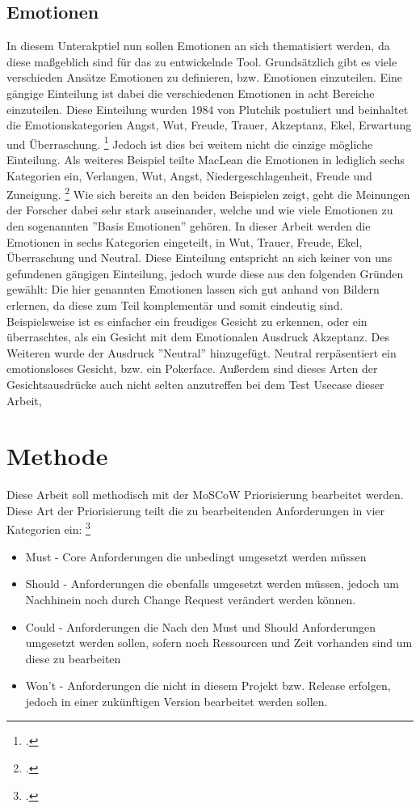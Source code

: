\documentclass[12pt, a4paper]{scrbook}
\begin{document}
\section{Emotionen}
In diesem Unterakptiel nun sollen Emotionen an sich thematisiert werden, da diese maßgeblich sind für das zu entwickelnde Tool. Grundsätzlich gibt es viele verschieden Ansätze Emotionen zu definieren, bzw. Emotionen einzuteilen. Eine gängige Einteilung ist dabei die verschiedenen Emotionen in acht Bereiche einzuteilen. Diese Einteilung wurden 1984 von Plutchik postuliert und beinhaltet die Emotionskategorien Angst, Wut, Freude, Trauer, Akzeptanz, Ekel, Erwartung und Überraschung.
\footcite[Vgl. ][3]{FaceRec}
Jedoch ist dies bei weitem nicht die einzige mögliche Einteilung. Als weiteres Beispiel teilte MacLean  die Emotionen in lediglich sechs Kategorien ein, Verlangen, Wut, Angst, Niedergeschlagenheit, Freude und Zuneigung.
\footcite[Vgl. ][3]{FaceRec}
Wie sich bereits an den beiden Beispielen zeigt, geht die Meinungen der Forscher  dabei sehr stark auseinander, welche und wie viele Emotionen zu den sogenannten ''Basis Emotionen'' gehören. In dieser Arbeit werden die Emotionen in sechs Kategorien eingeteilt, in Wut, Trauer, Freude, Ekel, Überraschung und Neutral. Diese Einteilung entspricht an sich keiner von uns gefundenen gängigen Einteilung, jedoch wurde diese aus den folgenden Gründen gewählt:
Die hier genannten Emotionen lassen sich gut anhand von Bildern erlernen, da diese zum Teil komplementär und somit eindeutig sind. Beispielsweise ist es einfacher ein freudiges Gesicht zu erkennen, oder ein überraschtes, als ein Gesicht mit dem Emotionalen Ausdruck Akzeptanz. Des Weiteren wurde der Ausdruck ''Neutral'' hinzugefügt. Neutral rerpäsentiert ein emotionsloses Gesicht, bzw. ein Pokerface. Außerdem sind dieses Arten der Gesichtsausdrücke auch nicht selten anzutreffen bei dem Test Usecase dieser Arbeit,


\let\cleardoublepage\relax
\newpage
\chapter{Methode}
Diese Arbeit soll methodisch mit der MoSCoW Priorisierung bearbeitet werden. Diese Art der Priorisierung teilt die zu bearbeitenden Anforderungen in vier Kategorien ein:
\footcite[vgl.][90]{Projektmanagement}
\begin{itemize}
\item Must - Core Anforderungen die unbedingt umgesetzt werden müssen
\item Should - Anforderungen die ebenfalls umgesetzt werden müssen, jedoch um Nachhinein noch durch Change Request verändert werden können.
\item Could - Anforderungen die Nach den Must und Should Anforderungen umgesetzt werden sollen, sofern noch Ressourcen und Zeit vorhanden sind um diese zu bearbeiten
\item Won't - Anforderungen die nicht in diesem Projekt bzw. Release erfolgen, jedoch in einer zukünftigen Version bearbeitet werden sollen. 
\end{itemize}
\end{document}
